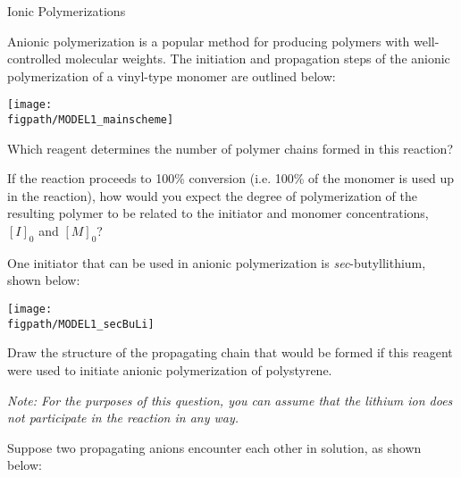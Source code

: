 \begin{activity}{Ionic Polymerizations}
\begin{instructornotes}
\end{instructornotes}


\begin{model}
	\label{\labelbase:mdl:anionic}

	Anionic polymerization is a popular method for producing polymers with well-controlled molecular weights.  The initiation and propagation steps of the anionic polymerization of a vinyl-type monomer are outlined below:
	
	\centerline{\texttt{[image: \\figpath/MODEL1\_mainscheme]}}
	
\end{model}


\begin{ctqs}

	
	\question Which reagent determines the number of polymer chains formed in this reaction?
	
		\begin{solution}[0.5in]
		\end{solution}
	
	\question If the reaction proceeds to 100\% conversion (i.e. 100\% of the monomer is used up in the reaction), how would you expect the degree of polymerization of the resulting polymer to be related to the initiator and monomer concentrations, $[I]_0$ and $[M]_0$?
	
		\begin{solution}[0.5in]
		\end{solution}
	
	\question One initiator that can be used in anionic polymerization is \emph{sec}-butyllithium, shown below:
	 \label{\labelbase:ctq:ps-anionic-prop}
	
	\centerline{\texttt{[image: \\figpath/MODEL1\_secBuLi]}}
	 	
	 	Draw the structure of the propagating chain that would be formed if this reagent were used to initiate anionic polymerization of polystyrene.
	 	
	 	\emph{Note: For the purposes of this question, you can assume that the lithium ion does not participate in the reaction in any way.}
	
		\begin{solution}[1in]
		\end{solution}
	
	\question Suppose two propagating anions encounter each other in solution, as shown below:
	

\end{ctqs}
\end{activity}

